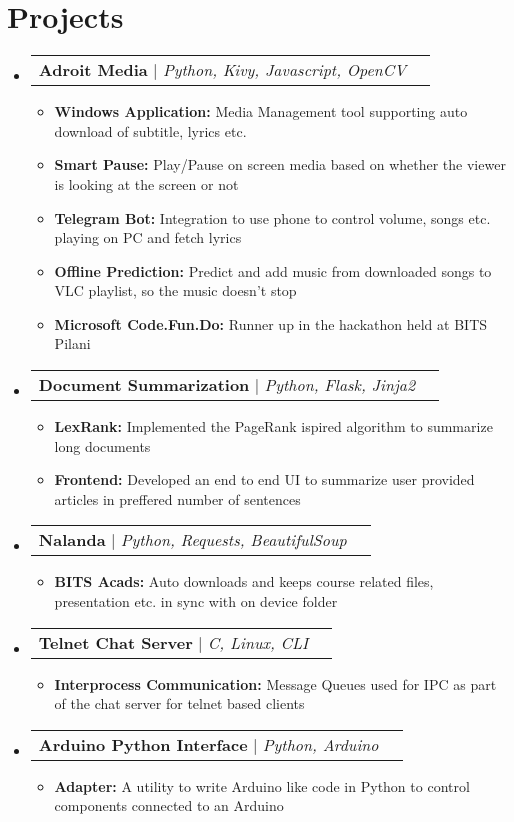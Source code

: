 \documentclass[letterpaper,11pt]{article}
\makeatletter
\newcommand{\resumeItem}[1]{
  \item\small{
    {#1 \vspace{-2pt}}
  }
}
\newcommand{\resumeProjectHeading}[2]{
    \item
    \begin{tabular*}{0.97\textwidth}{l@{\extracolsep{\fill}}r}
      \small#1 & #2 \\
    \end{tabular*}\vspace{-7pt}
}
\newcommand{\resumeSubHeadingListStart}{\begin{itemize}[leftmargin=0.15in, label={}]}
\newcommand{\resumeSubHeadingListEnd}{\end{itemize}}
\newcommand{\resumeItemListStart}{\begin{itemize}}
\newcommand{\resumeItemListEnd}{\end{itemize}\vspace{-5pt}}
\makeatother
\begin{document}
\section{Projects}
    \resumeSubHeadingListStart
      \resumeProjectHeading
          {\textbf{Adroit Media} $|$ \emph{Python, Kivy, Javascript, OpenCV}}{\href{https://adroitweb.github.io/}{\faGlobe} \href{https://github.com/triptu/AdroitMedia}{\faGithub}}
          \resumeItemListStart
            \resumeItem{\textbf{Windows Application:} Media Management tool supporting auto download of subtitle, lyrics etc.}
            \resumeItem{\textbf{Smart Pause:} Play/Pause on screen media based on whether the viewer is looking at the screen or not}
            \resumeItem{\textbf{Telegram Bot:} Integration to use phone to control volume, songs etc. playing on PC and fetch lyrics}
            \resumeItem{\textbf{Offline Prediction:} Predict and add music from downloaded songs to VLC playlist, so the music doesn't stop}
            \resumeItem{\textbf{Microsoft Code.Fun.Do:} Runner up in the hackathon held at BITS Pilani}
          \resumeItemListEnd
      \resumeProjectHeading
          {\textbf{Document Summarization} $|$ \emph{Python, Flask, Jinja2}}{}
          \resumeItemListStart
            \resumeItem{\textbf{LexRank:} Implemented the PageRank ispired algorithm to summarize long documents}
            \resumeItem{\textbf{Frontend:} Developed an end to end UI to summarize user provided articles in preffered number of sentences}
          \resumeItemListEnd
       \resumeProjectHeading
          {\textbf{Nalanda} $|$ \emph{Python, Requests, BeautifulSoup}}{\href{https://github.com/triptu/Nalanda}{\faGithub}}
          \resumeItemListStart
            \resumeItem{\textbf{BITS Acads:} Auto downloads and keeps course related files, presentation etc. in sync with on device folder}
          \resumeItemListEnd
      \resumeProjectHeading
          {\textbf{Telnet Chat Server} $|$ \emph{C, Linux, CLI}}{\href{https://github.com/triptu/chat-server-np}{\faGithub}}
          \resumeItemListStart
            \resumeItem{\textbf{Interprocess Communication:} Message Queues used for IPC as part of the chat server for telnet based clients}
          \resumeItemListEnd
      \resumeProjectHeading
          {\textbf{Arduino Python Interface} $|$ \emph{Python, Arduino}}{\href{https://github.com/triptu/ardupy}{\faGithub}}
          \resumeItemListStart
            \resumeItem{\textbf{Adapter:} A utility to write Arduino like code in Python to control components connected to an Arduino}
          \resumeItemListEnd
    \resumeSubHeadingListEnd
\end{document}
